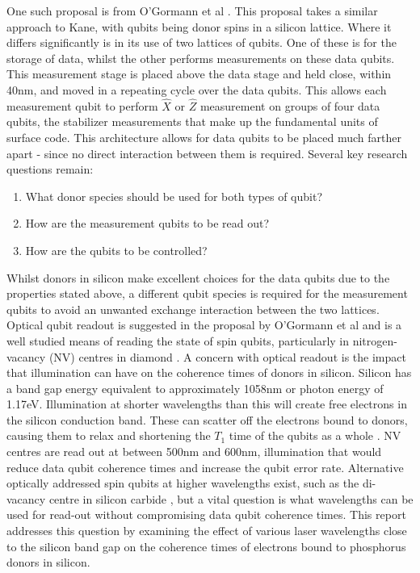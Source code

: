 One such proposal is from O'Gormann et al \cite{OGorman2014}. 
This proposal takes a similar approach to Kane, with qubits being donor spins in a silicon lattice. 
Where it differs significantly is in its use of two lattices of qubits. 
One of these is for the storage of data, whilst the other performs measurements on these data qubits. 
This measurement stage is placed above the data stage and held close, within 40nm, and moved in a repeating cycle over the data qubits.
This allows each measurement qubit to perform $\hat{X}$ or $\hat{Z}$ measurement on groups of four data qubits, the stabilizer measurements that make up the fundamental units of surface code.
This architecture allows for data qubits to be placed much farther apart - since no direct interaction between them is required.
Several key research questions remain:
\begin{enumerate}
	\item{What donor species should be used for both types of qubit?}
	\item{How are the measurement qubits to be read out?}
	\item{How are the qubits to be controlled?}
\end{enumerate}
Whilst donors in silicon make excellent choices for the data qubits due to the properties stated above, a different qubit species is required for the measurement qubits to avoid an unwanted exchange interaction between the two lattices.
Optical qubit readout is suggested in the proposal by O'Gormann et al and is a well studied means of reading the state of spin qubits, particularly in nitrogen-vacancy (NV) centres in diamond \cite{Liu2017}.
A concern with optical readout is the impact that illumination can have on the coherence times of donors in silicon. 
Silicon has a band gap energy equivalent to approximately 1058nm or photon energy of 1.17eV. 
Illumination at shorter wavelengths than this will create free electrons in the silicon conduction band.
These can scatter off the electrons bound to donors, causing them to relax and shortening the $T_1$ time of the qubits as a whole \cite{Ross2017}.  
NV centres are read out at between 500nm and 600nm, illumination that would reduce data qubit coherence times and increase the qubit error rate. 
Alternative optically addressed spin qubits at higher wavelengths exist, such as the di-vacancy centre in silicon carbide \cite{Christle2014}, but a vital question is what wavelengths can be used for read-out without compromising data qubit coherence times.
This report addresses this question by examining the effect of various laser wavelengths close to the silicon band gap on the coherence times of electrons bound to phosphorus donors in silicon.
